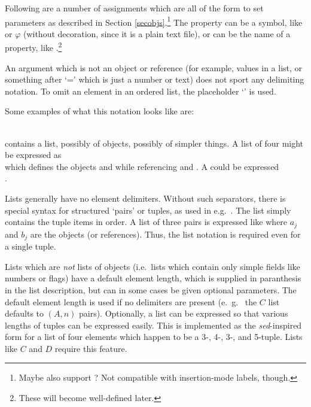 Following are a number of assignments which are all of the form
 to set parameters as described in Section
\ref{secobjs}.\footnote{Maybe also support ? Not
  compatible with insertion-mode labels, though.}  The property can be a symbol, like 
or $\varphi$ (without decoration, since it is a plain text file),
or can be the name of a property, like .\footnote{These
  will become well-defined later.}

An argument which is not an object or reference (for example, values
in a list, or something after `=' which is just a number or text) does
not sport any delimiting notation. To omit an element in an ordered
list, the placeholder `' is used.

Some examples of what this notation looks like are:\\
\inp{[zbox Stn\_AMK A=Station C=\{SubStation 1\} ]} \\
\inp{[zbox SubStn\_AMK\_NB A=SubStation C=\{Train 1 Platform 1\} m=Fifo L=1.0 z=<Stn\_AMK> ]}

\inp{\{\dots\}} contains a list, possibly of objects, possibly of simpler things.
A list of four  might be expressed as 
 \\
which defines the objects  and  while referencing  and .
A  could be expressed \\
\inp{[zlink TrainDoor1 $\mu$=<tr1> $\nu$=<tr2> A=\{Pax . b\}]}.

Lists generally have no element delimiters. Without such separators,
there is special syntax for structured `pairs' or tuples, as used in
e.g.~.  The list \inp{\{\dots\}}
simply contains the tuple items in order.  A list of three pairs is
expressed like  where
$a_j$ and $b_j$ are the objects (or references). Thus, the list
notation \inp{\{\dots\}} is required even for a single tuple.

Lists which are \emph{not} lists of objects (i.e.~lists which contain
only simple fields like numbers or flags) have a default element
length, which is supplied in paranthesis in the list description, but
can in some cases be given optional parameters.  The default element
length is used if no delimiters are present (e.~g.~ the 
$C$ list defaults to $(A,n)$ pairs).  Optionally, a list can be
expressed so that various lengths of tuples can be expressed easily.
This is implemented as the \emph{sed}-inspired form  for a list of four elements which
happen to be a 3-, 4-, 3-, and 5-tuple.  Lists like  $C$
and  $D$ require this feature.

